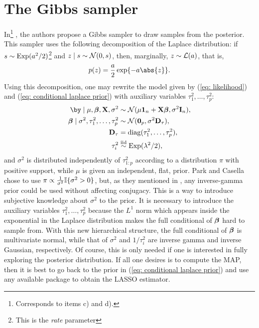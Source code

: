 \documentclass[a4paper, 10pt]{article}
\begin{document}
\section{The Gibbs sampler}
In\footnote{Corresponds to items c) and d).} \cite{parkcasella2008bayesianlasso}, the authors propose a Gibbs sampler to draw samples from the posterior.
This sampler uses the following decomposition of the Laplace distribution: if $s \sim \operatorname{Exp}(a^2 / 2)$\footnote{This is the \emph{rate} parameter} and $ z \mid s \sim \mathcal{N}(0, s) $, then, marginally, $ z \sim \mathcal{L}(a) $, that is,
\begin{equation*}
    p ( z ) = \frac{ a }{ 2 } \exp \{ - a \abs{ z } \}
.\end{equation*}
Using this decomposition, one may rewrite the model given by (\ref{eq: likelihood}) and (\ref{eq: conditional laplace prior}) with auxiliary variables $ \tau_{ 1 }^2, \dots, \tau_{ p }^2 $:
\begin{align*}
    \by \mid \mu, \betabold, \bX, \sigma^2 &\sim \Normal(\mu \ones_{ n } +  \bX \betabold, \sigma^2 \eye_n), \\
    \betabold \mid \sigma^2, \tau_{ 1 }^2, \dots, \tau_{ p }^2 &\sim \Normal (\zeros_{ p }, \sigma^2 \bD_{ \tau }), \\
    \bD_{ \tau } &= \diag (\tau_{ 1 }^2, \dots, \tau_{ p }^2), \\
    \tau_{ i }^2 &\iid \Exp(\lambda^2 / 2),
\end{align*}
and $ \sigma^2 $ is distributed independently of $ \tau_{ 1:p }^2 $ according to a distribution $ \pi $ with positive support, while $ \mu $ is given an independent, flat, prior.
Park and Casella chose to use $ \pi \propto \frac{ 1 }{ \sigma^2 } \mathbb{I} \{ \sigma^2 > 0 \} $, but, as they mentioned in \cite{parkcasella2008bayesianlasso}, any inverse-gamma prior could be used without affecting conjugacy.
This is a way to introduce subjective knowledge about $ \sigma^2 $ to the prior.
It is necessary to introduce the auxiliary variables $ \tau_{ 1 }^2, \dots, \tau_{ p }^2 $ because the $ L^1 $ norm which appears inside the exponential in the Laplace distribution makes the full conditional of $ \boldsymbol{\beta} $ hard to sample from.
With this new hierarchical structure, the full conditional of $ \boldsymbol{\beta} $ is multivariate normal, while that of $ \sigma^2 $ and $ 1/\tau_{ i }^2 $ are inverse gamma and inverse Gaussian, respectively.
Of course, this is only needed if one is interested in fully exploring the posterior distribution.
If all one desires is to compute the MAP, then it is best to go back to the prior in (\ref{eq: conditional laplace prior}) and use any available package to obtain the LASSO estimator.
\end{document}
